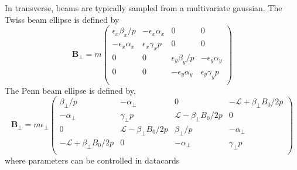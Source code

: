 In transverse, beams are typically sampled from a multivariate gaussian. The Twiss beam ellipse is defined by
\begin{equation}
\mathbf{B_\perp} = m \left(\begin{array}{cccc}
\epsilon_x \beta_x/p   & -\epsilon_x\alpha_x & 0 & 0 \\
-\epsilon_x\alpha_x & \epsilon_x\gamma_x p  & 0 & 0 \\
0 & 0  & \epsilon_y\beta_y/p  & -\epsilon_y\alpha_y \\
0 & 0 & -\epsilon_y\alpha_y & \epsilon_y\gamma_y p \\
\end{array}\right)
\end{equation}
The Penn beam ellipse is defined by,
\begin{equation}
\mathbf{B_\perp} = m\epsilon_\perp \left(\begin{array}{cccc}
\beta_\perp/p   & -\alpha_\perp & 0 & -\mathcal{L}+\beta_\perp B_0/2p \\
-\alpha_\perp & \gamma_\perp p  & \mathcal{L}-\beta_\perp B_0/2p & 0 \\
0 & \mathcal{L}-\beta_\perp B_0/2p  & \beta_\perp/p  & -\alpha_\perp \\
-\mathcal{L}+\beta_\perp B_0/2p & 0 & -\alpha_\perp & \gamma_\perp p \\
\end{array}\right)
\end{equation}
where parameters can be controlled in datacards

